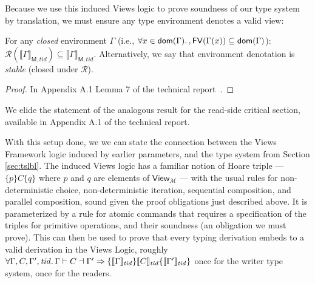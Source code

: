 
Because we use this induced Views logic to prove soundness of our type system by translation, we must ensure any type environment denotes a valid view:
\begin{lemma}\label{lemma:stblw}
For any \emph{closed} environment $\Gamma$ (i.e., $\forall x\in\mathsf{dom}(\Gamma)\ldotp, \mathsf{FV}(\Gamma(x))\subseteq\mathsf{dom}(\Gamma)$):
$
\mathcal{R}(\llbracket\Gamma\rrbracket_{\mathsf{M},tid})\subseteq\llbracket\Gamma\rrbracket_{\mathsf{M},tid}
$.
Alternatively, we say that environment denotation is \emph{stable} (closed under $\mathcal{R}$).
\end{lemma}
\begin{proof}
In Appendix A.1 Lemma 7 of the technical report~\cite{isotek}.
\end{proof}
We elide the statement of the analogous result for the read-side critical section, available in Appendix A.1 of the technical report.

With this setup done, we we can state the connection between the Views Framework logic induced by earlier parameters, and the type system from Section \ref{sec:tslbl}.
The induced Views logic has a familiar notion of Hoare triple --- $\{ p \} C \{ q \}$ where $p$ and $q$ are elements of $\mathsf{View}_\mathcal{M}$ --- with the usual rules for non-deterministic choice, non-deterministic iteration, sequential composition, and parallel composition, sound given the proof obligations just described above.  It is parameterized by a rule for atomic commands that requires a specification of the triples for primitive operations, and their soundness (an obligation we must prove).  This can then be used to prove that every typing derivation embeds to a valid derivation in the Views Logic, roughly
$\forall\Gamma,C,\Gamma',\mathit{tid}\ldotp\Gamma\vdash C\dashv \Gamma' \Rightarrow \{\llbracket\Gamma\rrbracket_\mathit{tid}\} \llbracket C\rrbracket_\mathit{tid}\{\llbracket\Gamma'\rrbracket_\mathit{tid}\}$
once for the writer type system, once for the readers.

